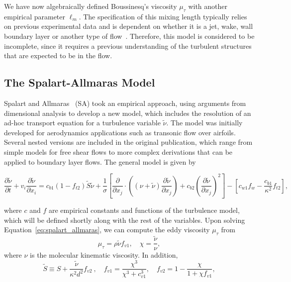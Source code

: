 We have now algebraically defined Boussinesq's viscosity $\mu_\tau$ with another empirical parameter $\ell_m$. The specification of this mixing length typically relies on previous experimental data and is dependent on whether it is a jet, wake, wall boundary layer or another type of flow~\cite{andersonComputationalFluidMechanics2016}. Therefore, this model is considered to be incomplete, since it requires a previous understanding of the turbulent structures that are expected to be in the flow. 

\subsection{The Spalart-Allmaras Model}
Spalart and Allmaras~\cite{spalartOneequationTurbulenceModel1992} (SA) took an empirical approach, using arguments from dimensional analysis to develop a new model, which includes the resolution of an ad-hoc transport equation for a turbulence variable $\tilde \nu$. The model was initially developed for aerodynamics applications such as transonic flow over airfoils. Several nested versions are included in the original publication, which range from simple models for free shear flows to more complex derivations that can be applied to boundary layer flows. The general model is given by
\begin{eqBox}
\begin{equation}
    \frac{\partial \tilde{\nu}}{\partial t} 
    + v_i \frac{\partial\tilde\nu}{\partial x_i} 
    = c_{b1} (1-f_{t2}) \tilde S \tilde \nu
    + \frac{1}{\sigma} 
     \left[ \frac{\partial}{\partial x_j} \cdot \left((\nu + \tilde \nu)\frac{\partial\tilde\nu}{\partial x_j} \right) 
      + c_{b2}\left(\frac{\partial\tilde \nu}{\partial x_j} \right)^2\right]
    - \left[c_{w1}f_w - \frac{c_{b1}}{\kappa^2}f_{t2}\right],
    \label{eq:spalart_allmaras}
\end{equation}
\end{eqBox}
where $c$ and $f$ are empirical constants and functions of the turbulence model, which will be defined shortly along with the rest of the variables. Upon solving Equation~\ref{eq:spalart_allmaras}, we can compute the eddy viscosity $\mu_\tau$ from
\begin{equation}
    \mu_\tau=\rho \tilde \nu f_{v1},\quad \chi=\frac{\tilde \nu}{\nu},
    \label{eq:sa_eddyviscosity}
\end{equation}
where $\nu$ is the molecular kinematic viscosity. In addition,
\begin{equation}
    \tilde S \equiv S + \frac{\tilde \nu}{\kappa^2 d^2}f_{v2}~,\quad f_{v1}=\frac{\chi^3}{\chi^3+c_{v1}^3},\quad f_{v2}=1-\frac{\chi}{1+\chi f_{v1}},
\end{equation}

